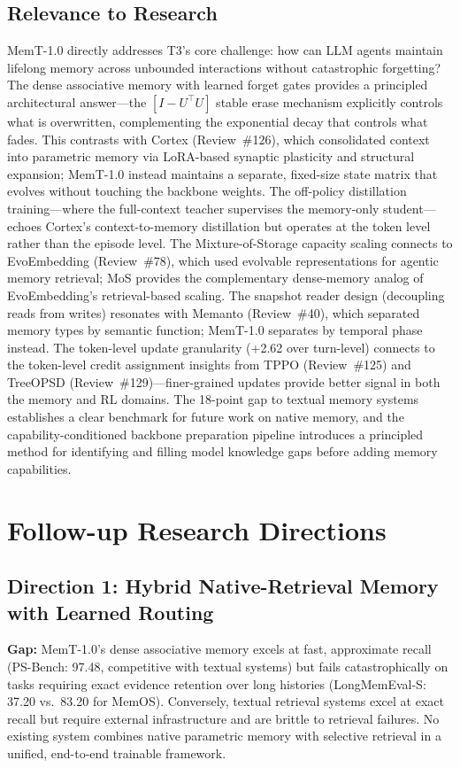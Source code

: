 \documentclass[11pt,a4paper]{article}
\begin{document}
\subsection{Relevance to Research}
MemT-1.0 directly addresses T3's core challenge: how can LLM agents maintain lifelong memory across unbounded interactions without catastrophic forgetting? The dense associative memory with learned forget gates provides a principled architectural answer---the $[I - U^\top U]$ stable erase mechanism explicitly controls what is overwritten, complementing the exponential decay that controls what fades. This contrasts with Cortex (Review~\#126), which consolidated context into parametric memory via LoRA-based synaptic plasticity and structural expansion; MemT-1.0 instead maintains a separate, fixed-size state matrix that evolves without touching the backbone weights. The off-policy distillation training---where the full-context teacher supervises the memory-only student---echoes Cortex's context-to-memory distillation but operates at the token level rather than the episode level. The Mixture-of-Storage capacity scaling connects to EvoEmbedding (Review~\#78), which used evolvable representations for agentic memory retrieval; MoS provides the complementary dense-memory analog of EvoEmbedding's retrieval-based scaling. The snapshot reader design (decoupling reads from writes) resonates with Memanto (Review~\#40), which separated memory types by semantic function; MemT-1.0 separates by temporal phase instead. The token-level update granularity ($+$2.62 over turn-level) connects to the token-level credit assignment insights from TPPO (Review~\#125) and TreeOPSD (Review~\#129)---finer-grained updates provide better signal in both the memory and RL domains. The 18-point gap to textual memory systems establishes a clear benchmark for future work on native memory, and the capability-conditioned backbone preparation pipeline introduces a principled method for identifying and filling model knowledge gaps before adding memory capabilities.

\section{Follow-up Research Directions}

\subsection{Direction 1: Hybrid Native-Retrieval Memory with Learned Routing}
\textbf{Gap:} MemT-1.0's dense associative memory excels at fast, approximate recall (PS-Bench: 97.48, competitive with textual systems) but fails catastrophically on tasks requiring exact evidence retention over long histories (LongMemEval-S: 37.20 vs.\ 83.20 for MemOS). Conversely, textual retrieval systems excel at exact recall but require external infrastructure and are brittle to retrieval failures. No existing system combines native parametric memory with selective retrieval in a unified, end-to-end trainable framework.
\end{document}
